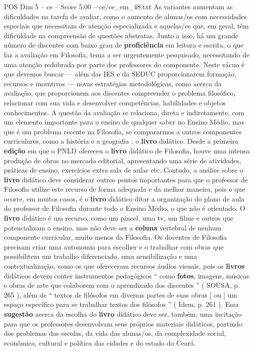 \begin{textsample}{POS Dim 5 – ce – Score 5.00 – ce/ce\_em\_48.txt}
As variantes aumentam as dificuldades na tarefa de avaliar, como o aumento de alunas/os com necessidades especiais que necessitam de atenção especializada e aquelas/es que, em geral, têm dificuldade na compreensão de questões abstratas.
Junto a isso, há um grande número de discentes com baixo grau de \textbf{proficiência} em leitura e escrita, o que faz a avaliação em Filosofia, tema a ser urgentemente pesquisado, necessitando de uma atenção redobrada por parte dos professores do componente.
Neste vácuo é que devemos buscar — além das IES e da SEDUC proporcionarem formação, recursos e incentivos — novas estratégias metodológicas, como acerca da avaliação, que proporcionem aos discentes compreender o problema filosófico, relacionar com sua vida e desenvolver competências, habilidades e objetos conhecimentos.
A questão da avaliação se relaciona, direta e indiretamente, com um elemento importante para o ensino de qualquer saber no Ensino Médio, mas que é um problema recente na Filosofia, se compararmos a outros componentes curriculares, como a história e a geografia : o \textbf{livro} didático.
Desde a primeira \textbf{edição} em que o PNLD ofereceu o \textbf{livro} didático de Filosofia, houve uma intensa produção de obras no mercado editorial, apresentando uma série de atividades, práticas de ensino, exercícios extra sala de aulas etc.
Contudo, a análise sobre o \textbf{livro} didático deve considerar outros pontos importantes para que o professor de Filosofia utilize este recurso de forma adequada e da melhor maneira, pois o que ocorre, em muitos casos, é o \textbf{livro} didático ditar a organização do plano de aula do professor de Filosofia durante todo o Ensino Médio, o que não é orientado.
O \textbf{livro} didático é um recurso, como um pincel, uma tv, um filme e outros que potencializam o ensino, mas não deve ser a \textbf{coluna} vertebral de nenhum componente curricular, muito menos da Filosofia.
Os docentes de Filosofia precisam criar uma autonomia para escolher e o trabalhar com obras que possibilitem um trabalho diferenciado, uma sensibilização e uma contextualização, como os que ofereceram recursos áudios visuais, pois os \textbf{livros} didáticos devem conter instrumentos pedagógicos “ como \textbf{fotos}, imagens, músicas e obras de arte que colaborem com o aprendizado dos discentes ” ( SOUSA, p. 265 ), além de “ textos de filósofos em diversas partes de suas obras [ ou ] um espaço específico para se trabalhar textos dos filósofos ” ( Idem, p. 261 ).
Essa \textbf{sugestão} acerca da escolha do \textbf{livro} didático deve ser, também, uma incitação para que os professores desenvolvam seus próprios materiais didáticos, partindo dos problemas das escolas, da vida das alunas/os, da complexidade social, econômica, cultural e política das cidades e do estado do Ceará.

\end{textsample}
